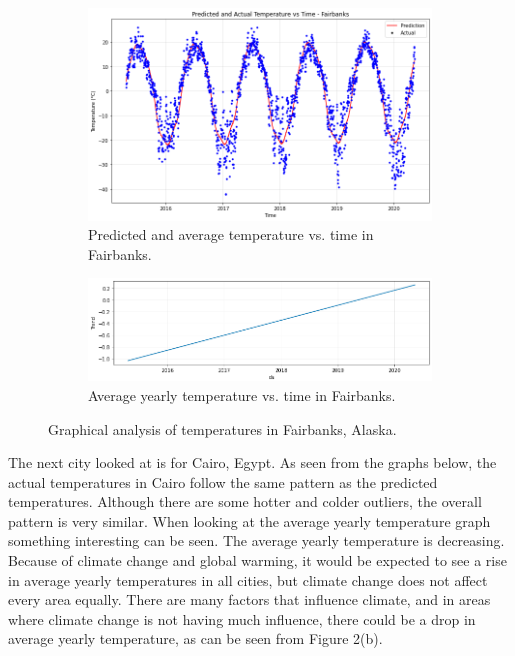 \documentclass[11pt,a4paper,fleqn]{article}
\begin{document}
\begin{figure}[h]
     \centering
     \begin{subfigure}[b]{0.4\textwidth}
         \centering
         \includegraphics[width=\textwidth]{Fairbanks.png}
         \caption{Predicted and average temperature vs. time in Fairbanks.}
     \end{subfigure}
     \hfill
     \begin{subfigure}[b]{0.5\textwidth}
         \centering
         \includegraphics[width=\textwidth]{FairbanksComponents.png}
         \caption{Average yearly temperature vs. time in Fairbanks.}
     \end{subfigure}
     \caption{Graphical analysis of temperatures in Fairbanks, Alaska.}
\end{figure}

The next city looked at is for Cairo, Egypt. As seen from the graphs below, the actual temperatures in Cairo follow the same pattern as the predicted temperatures. Although there are some hotter and colder outliers, the overall pattern is very similar. When looking at the average yearly temperature graph something interesting can be seen. The average yearly temperature is decreasing. Because of climate change and global warming, it would be expected to see a rise in average yearly temperatures in all cities, but climate change does not affect every area equally.\cite{forbeswebsite} There are many factors that influence climate, and in areas where climate change is not having much influence, there could be a drop in average yearly temperature, as can be seen from Figure 2(b).
\end{document}
